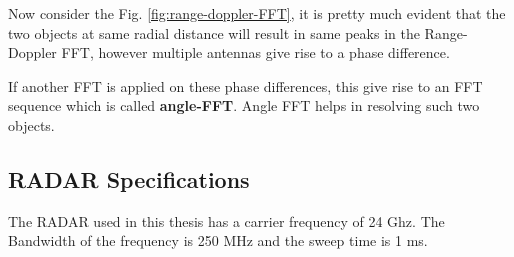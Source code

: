 Now consider the Fig. \ref{fig:range-doppler-FFT}, it is pretty much evident that the two objects at same radial distance will result in same peaks in the Range-Doppler FFT, however multiple antennas give rise to a phase difference.




If another FFT is applied on these phase differences, this give rise to an FFT sequence which is called \textbf{angle-FFT}. Angle FFT helps in resolving such two objects.




\subsection{RADAR Specifications}
The RADAR used in this thesis has a carrier frequency of 24 Ghz. The Bandwidth of the frequency is 250 MHz and the sweep time is 1 ms.

